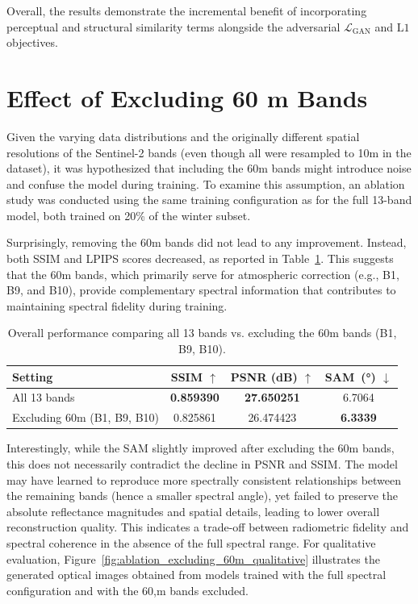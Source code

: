 Overall, the results demonstrate the incremental benefit of incorporating perceptual and structural similarity terms alongside the adversarial $\mathcal{L}_{\text{GAN}}$ and $\mathrm{L1}$ objectives. 

\section{Effect of Excluding 60 m Bands}
Given the varying data distributions and the originally different spatial resolutions of the Sentinel-2 bands (even though all were resampled to 10m in the dataset), it was hypothesized that including the 60m bands might introduce noise and confuse the model during training. To examine this assumption, an ablation study was conducted using the same training configuration as for the full 13-band model, both trained on 20\% of the winter subset.

Surprisingly, removing the 60m bands did not lead to any improvement. Instead, both SSIM and LPIPS scores decreased, as reported in Table~\ref{tab:ablation_excluding_60m}. This suggests that the 60m bands, which primarily serve for atmospheric correction (e.g., B1, B9, and B10), provide complementary spectral information that contributes to maintaining spectral fidelity during training.

\begin{table}[h!]
    \centering
    \setlength{\tabcolsep}{8pt}
    \renewcommand{\arraystretch}{1.15}
    \caption[Overall performance when excluding 60m bands]{Overall performance comparing all 13 bands vs. excluding the 60m bands (B1, B9, B10).}
    \label{tab:ablation_excluding_60m}
    \begin{tabular}{lccc}
        \hline
        \textbf{Setting} & \textbf{SSIM $\uparrow$} & \textbf{PSNR (dB) $\uparrow$} & \textbf{SAM~(°) $\downarrow$} \\
        \hline
        All 13 bands & \textbf{0.859390} & \textbf{27.650251} & 6.7064 \\
        Excluding 60m (B1, B9, B10) & 0.825861 & 26.474423 & \textbf{6.3339} \\
        \hline
    \end{tabular}
\end{table}

Interestingly, while the SAM slightly improved after excluding the 60m bands, this does not necessarily contradict the decline in PSNR and SSIM. The model may have learned to reproduce more spectrally consistent relationships between the remaining bands (hence a smaller spectral angle), yet failed to preserve the absolute reflectance magnitudes and spatial details, leading to lower overall reconstruction quality. This indicates a trade-off between radiometric fidelity and spectral coherence in the absence of the full spectral range. For qualitative evaluation, Figure~\ref{fig:ablation_excluding_60m_qualitative} illustrates the generated optical images obtained from models trained with the full spectral configuration and with the 60,m bands excluded.

